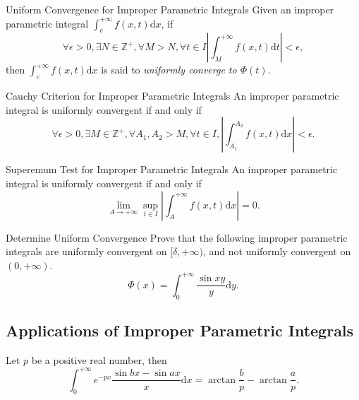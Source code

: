 \begin{definition}{Uniform Convergence for Improper Parametric Integrals}{}
  Given an improper parametric integral $\int_c^{+\infty}f(x, t)\mathrm{d} x$, if
  \begin{equation}
    \forall \epsilon > 0, \exists N \in \mathbb{Z}^+, \forall M > N, \forall t \in I
    \left| \int_M^{+\infty} f(x, t)\mathrm{d} t \right| < \epsilon,
  \end{equation}
  then $\int_c^{+\infty}f(x, t)\mathrm{d} x$ is said to \emph{uniformly converge
  to $\Phi(t)$}.
\end{definition}

\begin{proposition}{Cauchy Criterion for Improper Parametric Integrals}{}
  An improper parametric integral is uniformly convergent if and only if
  \begin{equation}
    \forall \epsilon > 0, \exists M \in \mathbb{Z}^+,
    \forall A_1, A_2 > M, \forall t \in I,
    \left| \int_{A_1}^{A_2}f(x,t)\mathrm{d}x \right| < \epsilon.
  \end{equation}
\end{proposition}

\begin{proposition}{Superemum Test for Improper Parametric Integrals}{}
  An improper parametric integral is uniformly convergent if and only if
  \begin{equation}
    \lim \limits _{A \rightarrow +\infty} \sup \limits_{t \in I} \left| \int_A^{+\infty} f(x,t)\mathrm{d}x \right| = 0.
  \end{equation}
\end{proposition}

\begin{example}{Determine Uniform Convergence}{}
  Prove that the following improper parametric integrals are
  uniformly convergent on $[\delta, +\infty)$, and not uniformly convergent
  on $(0, +\infty)$.
  \begin{equation}
    \Phi(x) = \int_0^{+\infty} \frac{\sin xy}{y} \mathrm{d} y.
  \end{equation}
\end{example}

\subsection{Applications of Improper Parametric Integrals}

\begin{proposition}{}{}
  Let $p$ be a positive real number, then
  \begin{equation}
    \int_0^{+\infty} e^{-px} \frac{\sin bx - \sin ax}{x} \mathrm{d} x
    = \arctan \frac{b}{p} - \arctan \frac{a}{p}.
  \end{equation}
\end{proposition}

